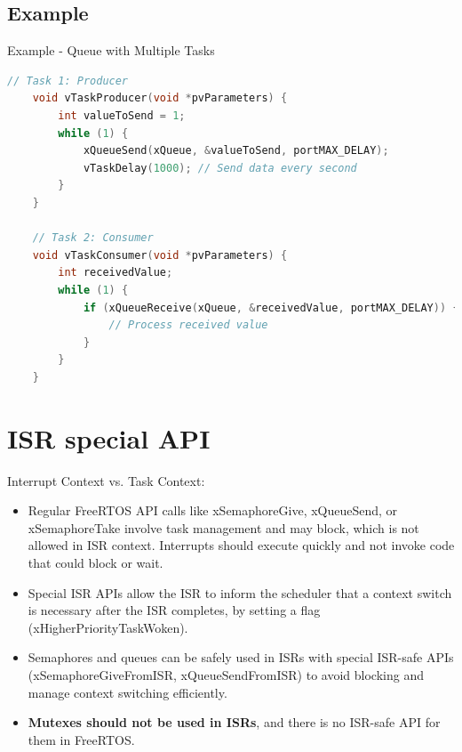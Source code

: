 \documentclass[10pt]{beamer}
\begin{document}
\subsection{Example}
\begin{frame}[fragile]{Example - Queue with Multiple Tasks}
    
    \begin{lstlisting}[language=C, caption=Queue with Multiple Tasks]
    // Task 1: Producer
    void vTaskProducer(void *pvParameters) {
        int valueToSend = 1;
        while (1) {
            xQueueSend(xQueue, &valueToSend, portMAX_DELAY);
            vTaskDelay(1000); // Send data every second
        }
    }
    
    // Task 2: Consumer
    void vTaskConsumer(void *pvParameters) {
        int receivedValue;
        while (1) {
            if (xQueueReceive(xQueue, &receivedValue, portMAX_DELAY)) {
                // Process received value
            }
        }
    }
    \end{lstlisting}
\end{frame}



\section{ISR special API}

\begin{frame}{Interrupt Context vs. Task Context:}
    \begin{itemize}
        \item Regular FreeRTOS API calls like xSemaphoreGive, xQueueSend, or xSemaphoreTake involve task management and may block, which is not allowed in ISR context. Interrupts should execute quickly and not invoke code that could block or wait.
        \item Special ISR APIs allow the ISR to inform the scheduler that a context switch is necessary after the ISR completes, by setting a flag (xHigherPriorityTaskWoken).
        \item Semaphores and queues can be safely used in ISRs with special ISR-safe APIs (xSemaphoreGiveFromISR, xQueueSendFromISR) to avoid blocking and manage context switching efficiently.
        \item \textbf{Mutexes should not be used in ISRs}, and there is no ISR-safe API for them in FreeRTOS.
    \end{itemize}
\end{frame}
\end{document}

